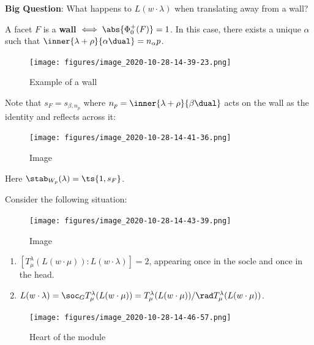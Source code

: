 \textbf{Big Question}: What happens to \(L(w\cdot \lambda)\) when
translating away from a wall?

\begin{definition}[Walls]

A facet \(F\) is a \textbf{wall} \(\iff \abs{ \Phi_0^+(F) } = 1\). In
this case, there exists a unique \(\alpha\) such that
\(\inner{\lambda + \rho}{\alpha\dual} = n_\alpha p\).

\begin{figure}
\centering
\texttt{[image: figures/image\_2020-10-28-14-39-23.png]}
\caption{Example of a wall}
\end{figure}

\end{definition}

\begin{remark}

Note that \(s_F = s_{\beta, n_p}\) where
\(n_p = \inner{\lambda + \rho}{\beta\dual}\) acts on the wall as the
identity and reflects across it:

\begin{figure}
\centering
\texttt{[image: figures/image\_2020-10-28-14-41-36.png]}
\caption{Image}
\end{figure}

Here \(\stab_{W_p}(\lambda) = \ts{1, s_F}\).

\end{remark}

\begin{proposition}[?]

Consider the following situation:

\begin{figure}
\centering
\texttt{[image: figures/image\_2020-10-28-14-43-39.png]}
\caption{Image}
\end{figure}

\begin{enumerate}
\def\labelenumi{\arabic{enumi}.}
\item
  \([T_\mu^\lambda (L(w\cdot \mu)) : L(w\cdot \lambda)] = 2\), appearing
  once in the socle and once in the head.
\item
  \(L(w\cdot \lambda) = \soc_G T_\mu^\lambda(L(w\cdot \mu)) = T_\mu^\lambda(L(w\cdot \mu)) / \rad T_\mu^\lambda (L(w\cdot \mu))\).
\end{enumerate}

\begin{figure}
\centering
\texttt{[image: figures/image\_2020-10-28-14-46-57.png]}
\caption{Heart of the module}
\end{figure}

\end{proposition}

